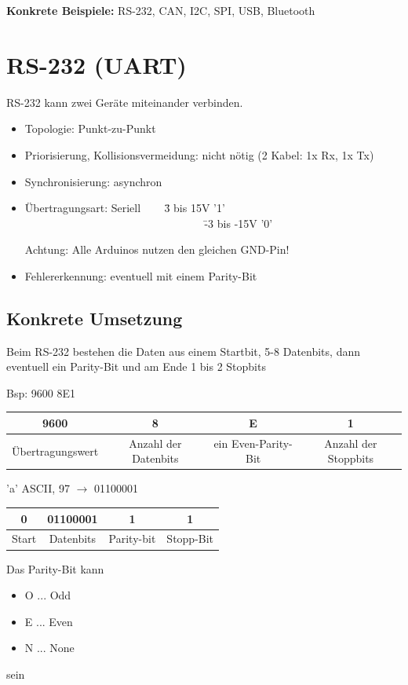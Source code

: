 \textbf{Konkrete Beispiele:} RS-232, CAN, I2C, SPI, USB, Bluetooth

\section{RS-232 (UART)}
RS-232 kann zwei Geräte miteinander verbinden.
\begin{itemize}
	\item Topologie: Punkt-zu-Punkt
	\item Priorisierung, Kollisionsvermeidung: nicht nötig (2 Kabel: 1x Rx, 1x Tx)
	\item Synchronisierung: asynchron
	\item \begin{tabbing}
		Übertragungsart: Seriell ~~~ \= 3 bis 15V '1' \\
		~~~~~~~~~~~~~~~~~~~~~~~~~~~~~~~~ \= -3 bis -15V '0'
	\end{tabbing}
	Achtung: Alle Arduinos nutzen den gleichen GND-Pin!
	\item Fehlererkennung: eventuell mit einem Parity-Bit
\end{itemize}

\subsection*{Konkrete Umsetzung}
Beim RS-232 bestehen die Daten aus einem Startbit, 5-8 Datenbits, dann eventuell ein Parity-Bit und am Ende 1 bis 2 Stopbits

Bsp: 9600 8E1 \\
\begin{tabular}{c|c|c|c}
	9600&8&E&1 \\
	\hline
	Übertragungswert&Anzahl der Datenbits&ein Even-Parity-Bit&Anzahl der Stoppbits \\
\end{tabular}


'a' ASCII, 97 $\rightarrow$ 01100001 \\

\begin{tabular}{c|c|c|c}
	0 & 01100001 & 1 & 1 \\
	\hline
	Start & Datenbits & Parity-bit & Stopp-Bit \\
\end{tabular}

Das Parity-Bit kann
\begin{itemize}
	\item O ... Odd
	\item E ... Even
	\item N ... None
\end{itemize}
sein

